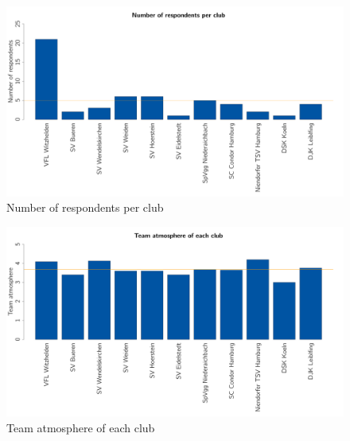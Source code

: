 \documentclass[	
	12pt, %
	a4paper, %
]{scrartcl}\usepackage[]{graphicx}\usepackage[]{color}
\newenvironment{knitrout}{}{} %
\begin{document}
\begin{knitrout}\footnotesize
{}\color{fgcolor}\begin{figure}[]


{\centering \includegraphics[width=1\linewidth]{figure/beamer-clubname} 

}

\caption[Number of respondents per club]{Number of respondents per club\label{fig:clubname}}
\end{figure}


\end{knitrout}


\begin{knitrout}\footnotesize
{}\color{fgcolor}\begin{figure}[]


{\centering \includegraphics[width=1\linewidth]{figure/beamer-atmosphere} 

}

\caption[Team atmosphere of each club]{Team atmosphere of each club\label{fig:atmosphere}}
\end{figure}


\end{knitrout}
\end{document}
